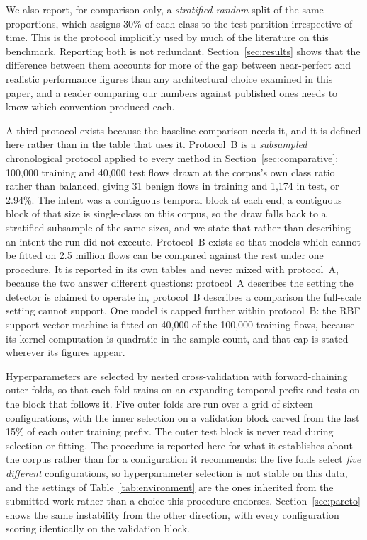 \documentclass{ieeeaccess}
\begin{document}
We also report, for comparison only, a \emph{stratified random} split of the same proportions, which assigns 30\% of each class to the test partition irrespective of time. This is the protocol implicitly used by much of the literature on this benchmark. Reporting both is not redundant. Section~\ref{sec:results} shows that the difference between them accounts for more of the gap between near-perfect and realistic performance figures than any architectural choice examined in this paper, and a reader comparing our numbers against published ones needs to know which convention produced each.

A third protocol exists because the baseline comparison needs it, and it is defined here rather than in the table that uses it. Protocol~B is a \emph{subsampled} chronological protocol applied to every method in Section~\ref{sec:comparative}: 100,000 training and 40,000 test flows drawn at the corpus's own class ratio rather than balanced, giving 31 benign flows in training and 1,174 in test, or 2.94\%. The intent was a contiguous temporal block at each end; a contiguous block of that size is single-class on this corpus, so the draw falls back to a stratified subsample of the same sizes, and we state that rather than describing an intent the run did not execute. Protocol~B exists so that models which cannot be fitted on 2.5 million flows can be compared against the rest under one procedure. It is reported in its own tables and never mixed with protocol~A, because the two answer different questions: protocol~A describes the setting the detector is claimed to operate in, protocol~B describes a comparison the full-scale setting cannot support. One model is capped further within protocol~B: the RBF support vector machine is fitted on 40,000 of the 100,000 training flows, because its kernel computation is quadratic in the sample count, and that cap is stated wherever its figures appear.

Hyperparameters are selected by nested cross-validation with forward-chaining outer folds, so that each fold trains on an expanding temporal prefix and tests on the block that follows it. Five outer folds are run over a grid of sixteen configurations, with the inner selection on a validation block carved from the last 15\% of each outer training prefix. The outer test block is never read during selection or fitting. The procedure is reported here for what it establishes about the corpus rather than for a configuration it recommends: the five folds select \emph{five different} configurations, so hyperparameter selection is not stable on this data, and the settings of Table~\ref{tab:environment} are the ones inherited from the submitted work rather than a choice this procedure endorses. Section~\ref{sec:pareto} shows the same instability from the other direction, with every configuration scoring identically on the validation block.
\end{document}
